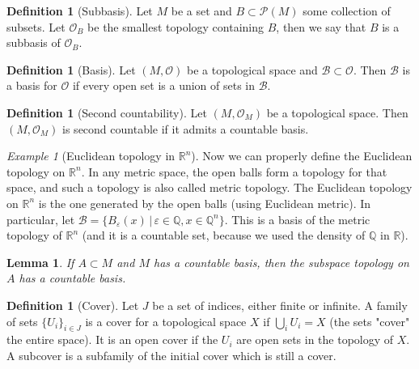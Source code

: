 \documentclass[a4paper,11pt,titlepage, article, oneside]{memoir}
\numberwithin{equation}{section}
\newtheorem{lemma}[theorem]{Lemma}
\theoremstyle{definition}
\newtheorem{definition}[theorem]{Definition}
\theoremstyle{remark}
\newtheorem{example}[theorem]{Example}
\newcommand{\rfield}{\mathbb{R}}
\begin{document}
\begin{definition}[Subbasis]
Let $M$ be a set and $B \subset \mathcal{P}(M)$ some collection of subsets. Let $\mathcal{O}_B$ be the smallest topology containing $B$, then we say that $B$ is a subbasis of $\mathcal{O}_B$.
\end{definition}

\begin{definition}[Basis]
Let $(M, \mathcal{O})$ be a topological space and $\mathcal{B} \subset \mathcal{O}$. Then $\mathcal{B}$ is a basis for $\mathcal{O}$ if every open set is a union of sets in $\mathcal{B}$.
\end{definition}

\begin{definition}[Second countability]
Let $(M, \mathcal{O}_M)$ be a topological space. Then $(M, \mathcal{O}_M)$ is second countable if it admits a countable basis.
\end{definition}

\begin{tcolorbox}\begin{example}[Euclidean topology in $\rfield^n$]
Now we can properly define the Euclidean topology on $\rfield^n$. In any metric space, the open balls form a topology for that space, and such a topology is also called metric topology. The Euclidean topology on $\rfield^n$ is the one generated by the open balls (using Euclidean metric). In particular, let $\mathcal{B} = \{B_{\varepsilon}(x) \, | \, \varepsilon \in \mathbb{Q}, x \in \mathbb{Q}^n \}$. This is a basis of the metric topology of $\rfield^n$ (and it is a countable set, because we used the density of $\mathbb{Q}$ in $\rfield$).
\end{example}\end{tcolorbox}

\begin{lemma}
If $A \subset M$ and $M$ has a countable basis, then the subspace topology on $A$ has a countable basis.
\end{lemma}

\begin{definition}[Cover]
Let $J$ be a set of indices, either finite or infinite. A family of sets $\{U_i\}_{i \in J}$ is a cover for a topological space $X$ if $\bigcup\limits_i U_i = X$ (the sets "cover" the entire space). It is an open cover if the $U_i$ are open sets in the topology of $X$. A subcover is a subfamily of the initial cover which is still a cover.
\end{definition}
\end{document}
